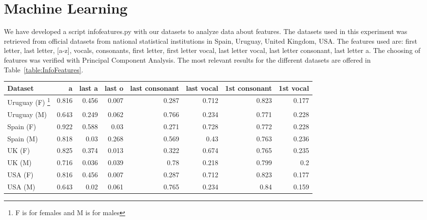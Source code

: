 \documentclass[a4paper]{article}
\begin{document}
\section{Machine Learning}

We have developed a script infofeatures.py with our datasets to analyze data about features.
The datasets used in this experiment was retrieved from official datasets from national statistical
institutions in Spain, Uruguay, United Kingdom, USA. The features used are: first letter, last letter, [a-z], vocals, consonants, first letter, first letter vocal, last letter vocal, last letter consonant, last letter a. 
The choosing of features was verified with Principal Component Analysis.
The most relevant results for the different datasets are offered in Table~\ref{table:InfoFeatures}.

\begin{table*}
\footnotesize
\begin{tabular}[]{lrrrrrrr}
  \hline
Dataset & a & last a & last o & last consonant & last vocal & 1st consonant & 1st vocal  \tabularnewline
  \hline
 Uruguay (F) \footnote{F is for females and M is for males} &    0.816 &         0.456 &         0.007 &                 0.287 &             0.712 &                  0.823 &              0.177  \tabularnewline
 Uruguay (M) \footnotemark[3] &    0.643 &         0.249 &         0.062 &                 0.766 &             0.234 &                  0.771 &              0.228  \tabularnewline
 Spain (F) \footnotemark[3]  &    0.922 &         0.588 &          0.03 &                 0.271 &             0.728 &                  0.772 &              0.228  \tabularnewline
 Spain (M) \footnotemark[3]  &    0.818 &          0.03 &         0.268 &                 0.569 &              0.43 &                  0.763 &              0.236  \tabularnewline
 UK (F) \footnotemark[3]     &    0.825 &         0.374 &         0.013 &                 0.322 &             0.674 &                  0.765 &              0.235  \tabularnewline
 UK (M) \footnotemark[3]     &    0.716 &         0.036 &         0.039 &                  0.78 &             0.218 &                  0.799 &                0.2  \tabularnewline
 USA (F) \footnotemark[3]    &    0.816 &         0.456 &         0.007 &                 0.287 &             0.712 &                  0.823 &              0.177  \tabularnewline
 USA (M) \footnotemark[3]    &    0.643 &          0.02 &         0.061 &                 0.765 &             0.234 &                   0.84 &              0.159  \tabularnewline
\hline
\end{tabular}
\caption{Informative Features in Different Countries}
\label{table:InfoFeatures}
\end{table*}
\end{document}
